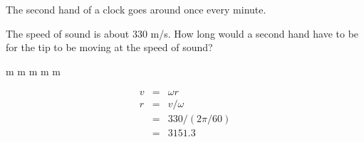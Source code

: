 \question[10] The second hand of a clock goes around once every minute. 

The speed of sound is about 330 m/s. How long would a second hand have to be
for the tip to be moving at the speed of sound?

\begin{choices}
 m
 m
 m
 m
 m
\end{choices}

\begin{solution}[8cm]
    \begin{eqnarray}
        v &=& \omega r \\
        r &=& v /\omega  \\
          &=& 330 /(2\pi/60)  \\
          &=& 3151.3\\
    \end{eqnarray}
\end{solution}

